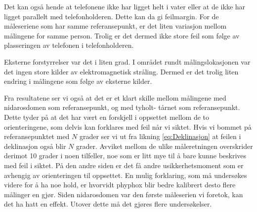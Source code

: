 \begin{itemize}
Det kan også hende at telefonene ikke har ligget helt i vater eller at de ikke har ligget parallelt med telefonholderen. Dette kan da gi feilmargin. For de måleseriene som har samme referansepunkt, er det liten variasjon mellom målingene for samme person. Trolig er det dermed ikke store feil som følge av plasseringen av telefonen i telefonholderen. 

Eksterne forstyrrelser var det i liten grad. I området rundt målingslokasjonen var det ingen store kilder av elektromagnetisk stråling. Dermed er det trolig liten endring i målingene som følge av eksterne kilder. 

Fra resultatene ser vi også at det er et klart skille mellom målingene med nidarosdomen som referansepunkt, og med tyholt-
tårnet som referansepunkt. Dette tyder på at det har vært en forskjell i oppsettet mellom de to orienteringene, som delvis 
kan forklares med feil når vi siktet. Hvis vi bommet på referansepunktet med $N$ grader ser vi ut fra likning 
\eqref{eq:Deklinasjon} at feilen i deklinasjon også blir $N$ grader. Avviket mellom de ulike måleretningen overskrider 
derimot 10 grader i noen tilfeller, noe som er litt mye til å bare kunne beskrives med feil i siktet. På den andre siden er 
det få andre usikkerhetsmoment som er avhengig av orienteringen til oppsettet. En mulig forklaring, som må undersøkes videre 
for å ha noe hold, er hvorvidt phyphox blir bedre kalibrert desto flere målinger en gjør. Siden nidarosdomen var den første måleserien vi foretok, kan det ha hatt en effekt.
Utover dette må det gjøres flere undersøkelser.

\end{itemize}



 